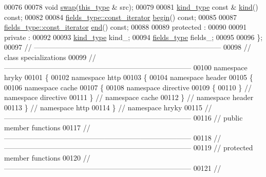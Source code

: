 \begin{DoxyCode}
00076 
00078     \textcolor{keywordtype}{void} \hyperlink{classhryky_1_1http_1_1header_1_1cache_1_1directive_1_1_field_a0d2c3ec5b08b2bec8b59acd3de77b4c0}{swap}(\hyperlink{classhryky_1_1http_1_1header_1_1cache_1_1directive_1_1_field}{this_type} & src);
00079 
00081     \hyperlink{classhryky_1_1_kind}{kind_type} \textcolor{keyword}{const} & \hyperlink{classhryky_1_1http_1_1header_1_1cache_1_1directive_1_1_field_a295194a77be64b33ef94c65074d07e8c}{kind}() \textcolor{keyword}{const};
00082 
00084     \hyperlink{classhryky_1_1iterator_1_1random_1_1_immutable}{fields_type::const_iterator} \hyperlink{classhryky_1_1http_1_1header_1_1cache_1_1directive_1_1_field_aeaf26d4bfc81f4203384f149888e218a}{begin}() \textcolor{keyword}{const};
00085 
00087     \hyperlink{classhryky_1_1iterator_1_1random_1_1_immutable}{fields_type::const_iterator} \hyperlink{classhryky_1_1http_1_1header_1_1cache_1_1directive_1_1_field_ac3d43ece779fd7ff567776b643b28093}{end}() \textcolor{keyword}{const};
00088 
00089 \textcolor{keyword}{protected} :
00090 
00091 \textcolor{keyword}{private} :
00092 
00093     \hyperlink{classhryky_1_1_kind}{kind_type}   kind\_;
00094     \hyperlink{classhryky_1_1_vector}{fields_type} fields\_;
00095 
00096 \};
00097 \textcolor{comment}{//
      ------------------------------------------------------------------------------}
00098 \textcolor{comment}{// class specializations}
00099 \textcolor{comment}{//
      ------------------------------------------------------------------------------}
00100 \textcolor{keyword}{namespace }hryky
00101 \{
00102 \textcolor{keyword}{namespace }http
00103 \{
00104 \textcolor{keyword}{namespace }header
00105 \{
00106 \textcolor{keyword}{namespace }cache
00107 \{
00108 \textcolor{keyword}{namespace }directive
00109 \{
00110 \} \textcolor{comment}{// namespace directive}
00111 \} \textcolor{comment}{// namespace cache}
00112 \} \textcolor{comment}{// namespace header}
00113 \} \textcolor{comment}{// namespace http}
00114 \} \textcolor{comment}{// namespace hryky}
00115 \textcolor{comment}{//
      ------------------------------------------------------------------------------}
00116 \textcolor{comment}{// public member functions}
00117 \textcolor{comment}{//
      ------------------------------------------------------------------------------}
00118 \textcolor{comment}{//
      ------------------------------------------------------------------------------}
00119 \textcolor{comment}{// protected member functions}
00120 \textcolor{comment}{//
      ------------------------------------------------------------------------------}
00121 \textcolor{comment}{//
}
\end{DoxyCode}
